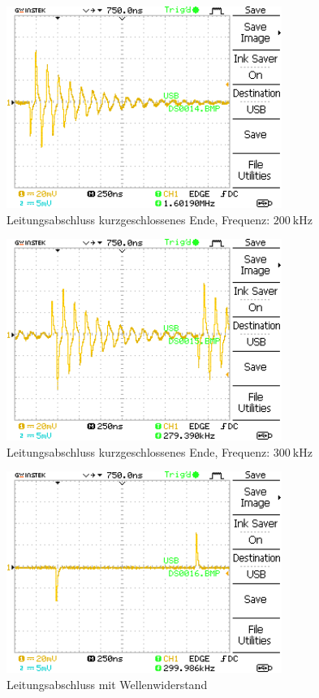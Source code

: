\documentclass{article}
\begin{document}
				\begin{figure}[H]
					\centering
					\includegraphics[width=0.8\textwidth]{MesswerteVersuch1/DS0014.png}	

					\caption{Leitungsabschluss kurzgeschlossenes Ende, Frequenz: $\SI{200}{\kilo\hertz}$}
					\label{fig:DS0014}
				\end{figure}
				\begin{figure}[H]
					\centering
					\includegraphics[width=0.8\textwidth]{MesswerteVersuch1/DS0015.png}	

					\caption{Leitungsabschluss kurzgeschlossenes Ende, Frequenz: $\SI{300}{\kilo\hertz}$}
					\label{fig:DS0015}
				\end{figure}
				\begin{figure}[H]
					\centering
					\includegraphics[width=0.8\textwidth]{MesswerteVersuch1/DS0016.png}	

					\caption{Leitungsabschluss mit Wellenwiderstand}
					\label{fig:DS0016}
				\end{figure}
\clearpage
\end{document}
